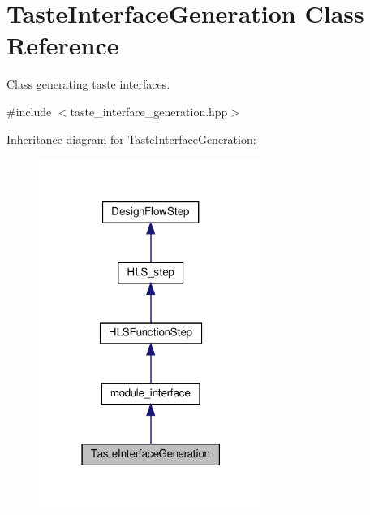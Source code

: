\hypertarget{classTasteInterfaceGeneration}{}\section{Taste\+Interface\+Generation Class Reference}
\label{classTasteInterfaceGeneration}


Class generating taste interfaces.  




{\ttfamily \#include $<$taste\+\_\+interface\+\_\+generation.\+hpp$>$}



Inheritance diagram for Taste\+Interface\+Generation\+:
\nopagebreak
\begin{figure}[H]
\begin{center}
\leavevmode
\includegraphics[width=207pt]{d6/df0/classTasteInterfaceGeneration__inherit__graph}
\end{center}
\end{figure}


